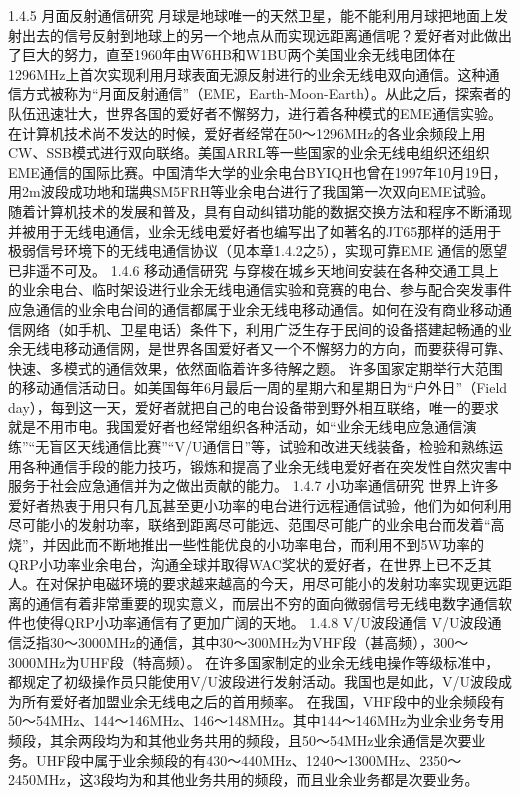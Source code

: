 \documentclass[12pt,UTF8]{ctexbook}
\begin{document}
1.4.5 月面反射通信研究
月球是地球唯一的天然卫星，能不能利用月球把地面上发射出去的信号反射到地球上的另一个地点从而实现远距离通信呢？爱好者对此做出了巨大的努力，直至1960年由W6HB和W1BU两个美国业余无线电团体在1296MHz上首次实现利用月球表面无源反射进行的业余无线电双向通信。这种通信方式被称为“月面反射通信”（EME，Earth-Moon-Earth）。从此之后，探索者的队伍迅速壮大，世界各国的爱好者不懈努力，进行着各种模式的EME通信实验。在计算机技术尚不发达的时候，爱好者经常在50～1296MHz的各业余频段上用CW、SSB模式进行双向联络。美国ARRL等一些国家的业余无线电组织还组织EME通信的国际比赛。中国清华大学的业余电台BYIQH也曾在1997年10月19日，用2m波段成功地和瑞典SM5FRH等业余电台进行了我国第一次双向EME试验。
随着计算机技术的发展和普及，具有自动纠错功能的数据交换方法和程序不断涌现并被用于无线电通信，业余无线电爱好者也编写出了如著名的JT65那样的适用于极弱信号环境下的无线电通信协议（见本章1.4.2之5），实现可靠EME 通信的愿望已非遥不可及。
1.4.6 移动通信研究
与穿梭在城乡天地间安装在各种交通工具上的业余电台、临时架设进行业余无线电通信实验和竞赛的电台、参与配合突发事件应急通信的业余电台间的通信都属于业余无线电移动通信。如何在没有商业移动通信网络（如手机、卫星电话）条件下，利用广泛生存于民间的设备搭建起畅通的业余无线电移动通信网，是世界各国爱好者又一个不懈努力的方向，而要获得可靠、快速、多模式的通信效果，依然面临着许多待解之题。
许多国家定期举行大范围的移动通信活动日。如美国每年6月最后一周的星期六和星期日为“户外日”（Field day），每到这一天，爱好者就把自己的电台设备带到野外相互联络，唯一的要求就是不用市电。我国爱好者也经常组织各种活动，如“业余无线电应急通信演练”“无盲区天线通信比赛”“V/U通信日”等，试验和改进天线装备，检验和熟练运用各种通信手段的能力技巧，锻炼和提高了业余无线电爱好者在突发性自然灾害中服务于社会应急通信并为之做出贡献的能力。
1.4.7 小功率通信研究
世界上许多爱好者热衷于用只有几瓦甚至更小功率的电台进行远程通信试验，他们为如何利用尽可能小的发射功率，联络到距离尽可能远、范围尽可能广的业余电台而发着“高烧”，并因此而不断地推出一些性能优良的小功率电台，而利用不到5W功率的QRP小功率业余电台，沟通全球并取得WAC奖状的爱好者，在世界上已不乏其人。在对保护电磁环境的要求越来越高的今天，用尽可能小的发射功率实现更远距离的通信有着非常重要的现实意义，而层出不穷的面向微弱信号无线电数字通信软件也使得QRP小功率通信有了更加广阔的天地。
1.4.8 V/U波段通信
V/U波段通信泛指30～3000MHz的通信，其中30～300MHz为VHF段（甚高频），300～3000MHz为UHF段（特高频）。
在许多国家制定的业余无线电操作等级标准中，都规定了初级操作员只能使用V/U波段进行发射活动。我国也是如此，V/U波段成为所有爱好者加盟业余无线电之后的首用频率。
在我国，VHF段中的业余频段有50～54MHz、144～146MHz、146～148MHz。其中144～146MHz为业余业务专用频段，其余两段均为和其他业务共用的频段，且50～54MHz业余通信是次要业务。UHF段中属于业余频段的有430～440MHz、1240～1300MHz、2350～2450MHz，这3段均为和其他业务共用的频段，而且业余业务都是次要业务。
\end{document}
